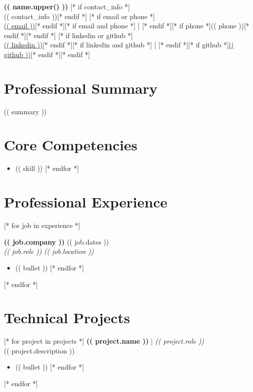 \documentclass[11pt, letterpaper]{article}
\newcommand{\jobheader}[4]{
  \noindent
  \textbf{#1} \hfill #2 \\
  \textit{#3} \hfill \textit{#4} \vspace{2pt}
}
\begin{document}
\begin{center}
    {\huge \bfseries (( name.upper() ))}
    [* if contact_info *]\\(( contact_info ))[* endif *]
    [* if email or phone *]\\[* if email *]\href{mailto:(( email ))}{(( email ))}[* endif *][* if email and phone *] | [* endif *][* if phone *](( phone ))[* endif *][* endif *]
    [* if linkedin or github *]\\[* if linkedin *]\href{https://(( linkedin ))}{(( linkedin ))}[* endif *][* if linkedin and github *] | [* endif *][* if github *]\href{https://(( github ))}{(( github ))}[* endif *][* endif *]
\end{center}

\section{Professional Summary}
(( summary ))

\section{Core Competencies}
\begin{itemize}
    [* for skill in skills *]
    \item (( skill ))
    [* endfor *]
\end{itemize}

\section{Professional Experience}
[* for job in experience *]
\jobheader{ (( job.company )) }{ (( job.dates )) }{ (( job.role )) }{ (( job.location )) }
\begin{itemize}
    [* for bullet in job.bullets *]
    \item (( bullet ))
    [* endfor *]
\end{itemize}
\vspace{8pt}
[* endfor *]

\section{Technical Projects}
[* for project in projects *]
\noindent \textbf{ (( project.name )) } | \textit{ (( project.role )) } \\
(( project.description ))
\begin{itemize}
    [* for bullet in project.bullets *]
    \item (( bullet ))
    [* endfor *]
\end{itemize}
\vspace{6pt}
[* endfor *]
\end{document}
